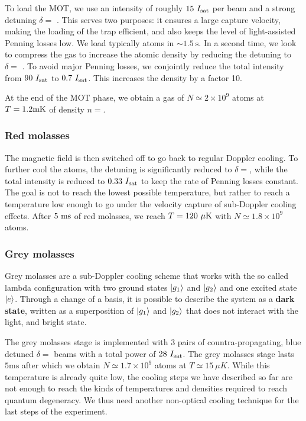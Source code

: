 To load the MOT, we use an intensity of roughly $15 \ I_{\mathrm{sat}}$ per beam and a strong detuning $\delta =$ . This serves two purposes: it ensures a large capture velocity, making the loading of the trap efficient, and also keeps the level of light-assisted Penning losses low. We load typically  atoms in $\sim 1.5 \ \mathrm{s}$. In a second time, we look to compress the gas to increase the atomic density by reducing the detuning to $\delta =$ . To avoid major Penning losses, we conjointly reduce the total intensity from $90 \ I_{\mathrm{sat}}$ to $0.7 \ I_{\mathrm{sat}}$. This increases the density by a factor 10.

At the end of the MOT phase, we obtain a gas of $N \simeq 2 \times 10^9$ atoms at $T=1.2 \rm{mK}$ of density $n=$.

\subsubsection{Red molasses}

The magnetic field is then switched off to go back to regular Doppler cooling. To further cool the atoms, the detuning is significantly reduced to $\delta=$, while the total intensity is reduced to $0.33 \ I_{\mathrm{sat}}$ to keep the rate of Penning losses constant. The goal is not to reach the lowest possible temperature, but rather to reach a temperature low enough to go under the velocity capture of sub-Doppler cooling effects. After $5 \ \rm{ms}$ of red molasses, we reach $T=120 \ \mu \rm{K}$ with $N\simeq 1.8 \times 10^9$ atoms.

\subsubsection{Grey molasses}

Grey molasses are a sub-Doppler cooling scheme that works with the so called lambda configuration with two ground states $\ket{g_1}$ and $\ket{g_2}$ and one excited state $\ket{e}$. Through a change of a basis, it is possible to describe the system as a \textbf{dark state}, written as a superposition of $\ket{g_1}$ and $\ket{g_2}$ that does not interact with the light, and bright state. 

The grey molasses stage is implemented with 3 pairs of countra-propagating, blue detuned $\delta =$ beams with a total power of $28 \ \Isat$. The grey molasses stage lasts $5 \mathrm{ms}$ after which we obtain $N \simeq 1.7 \times 10^9$ atoms at $T \simeq 15 \ \mu K$. While this temperature is already quite low, the cooling steps we have described so far are not enough to reach the kinds of temperatures and densities required to reach quantum degeneracy. We thus need another non-optical cooling technique for the last steps of the experiment.


